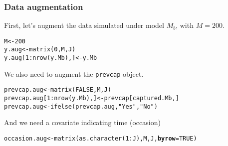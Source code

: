 \documentclass[color=usenames,dvipsnames]{beamer}\usepackage[]{graphicx}\usepackage[]{color}
\makeatletter
\newcommand{\hlnum}[1]{\textcolor[rgb]{0.69,0.494,0}{#1}}%
\newcommand{\hlstr}[1]{\textcolor[rgb]{0.749,0.012,0.012}{#1}}%
\newcommand{\hlopt}[1]{\textcolor[rgb]{0,0,0}{#1}}%
\newcommand{\hlstd}[1]{\textcolor[rgb]{0,0,0}{#1}}%
\newcommand{\hlkwb}[1]{\textcolor[rgb]{0,0.341,0.682}{#1}}%
\newcommand{\hlkwc}[1]{\textcolor[rgb]{0,0,0}{\textbf{#1}}}%
\newcommand{\hlkwd}[1]{\textcolor[rgb]{0.004,0.004,0.506}{#1}}%
\newenvironment{kframe}{%
 \def\at@end@of@kframe{}%
 \ifinner\ifhmode%
  \def\at@end@of@kframe{\end{minipage}}%
  \begin{minipage}{\columnwidth}%
 \fi\fi%
 \def\FrameCommand##1{\hskip\@totalleftmargin \hskip-\fboxsep
 \colorbox{shadecolor}{##1}\hskip-\fboxsep
     \hskip-\linewidth \hskip-\@totalleftmargin \hskip\columnwidth}%
 \MakeFramed {\advance\hsize-\width
   \@totalleftmargin\z@ \linewidth\hsize
   \@setminipage}}%
 {\par\unskip\endMakeFramed%
 \at@end@of@kframe}
\newenvironment{knitrout}{}{} %
\newcommand{\inr}[1]{\colorbox{inlinecolor}{\texttt{#1}}}
\makeatother
\begin{document}
\begin{frame}[fragile]
  \frametitle{Data augmentation}
  First, let's augment the data simulated under model $M_b$, with
  $M=200$.
\vspace{-6pt}
\begin{knitrout}\scriptsize
{}\color{fgcolor}\begin{kframe}
\begin{alltt}
\hlstd{M} \hlkwb{<-} \hlnum{200}
\hlstd{y.aug} \hlkwb{<-} \hlkwd{matrix}\hlstd{(}\hlnum{0}\hlstd{, M, J)}
\hlstd{y.aug[}\hlnum{1}\hlopt{:}\hlkwd{nrow}\hlstd{(y.Mb),]} \hlkwb{<-} \hlstd{y.Mb}
\end{alltt}
\end{kframe}
\end{knitrout}
\pause
\vfill
We also need to augment the \inr{prevcap} object.
\vspace{-6pt}
\begin{knitrout}\scriptsize
{}\color{fgcolor}\begin{kframe}
\begin{alltt}
\hlstd{prevcap.aug} \hlkwb{<-} \hlkwd{matrix}\hlstd{(}\hlnum{FALSE}\hlstd{, M, J)}
\hlstd{prevcap.aug[}\hlnum{1}\hlopt{:}\hlkwd{nrow}\hlstd{(y.Mb),]} \hlkwb{<-} \hlstd{prevcap[captured.Mb,]}
\hlstd{prevcap.aug} \hlkwb{<-} \hlkwd{ifelse}\hlstd{(prevcap.aug,} \hlstr{"Yes"}\hlstd{,} \hlstr{"No"}\hlstd{)}
\end{alltt}
\end{kframe}
\end{knitrout}
And we need a covariate indicating time (occasion)
\vspace{-6pt}
\begin{knitrout}\scriptsize
{}\color{fgcolor}\begin{kframe}
\begin{alltt}
\hlstd{occasion.aug} \hlkwb{<-} \hlkwd{matrix}\hlstd{(}\hlkwd{as.character}\hlstd{(}\hlnum{1}\hlopt{:}\hlstd{J), M, J,} \hlkwc{byrow}\hlstd{=}\hlnum{TRUE}\hlstd{)}
\end{alltt}
\end{kframe}
\end{knitrout}
\end{frame}
\end{document}

